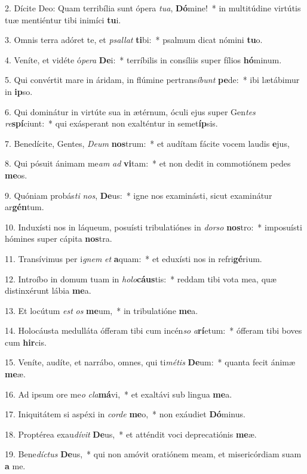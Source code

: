 2. Dícite Deo: Quam terribília sunt ópera \textit{tu}\textit{a}, \textbf{Dó}mine!~*  in multitúdine virtútis tuæ mentiéntur tibi inimíci \textbf{tu}i.\

3. Omnis terra adóret te, et \textit{psal}\textit{lat} \textbf{ti}bi:~*  psalmum dicat nómini \textbf{tu}o.\

4. Veníte, et vidéte ó\textit{pe}\textit{ra} \textbf{De}i:~*  terríbilis in consíliis super fílios \textbf{hó}minum.\

5. Qui convértit mare in áridam, in flúmine pertrans\textit{í}\textit{bunt} \textbf{pe}de:~*  ibi lætábimur in \textbf{ip}so.\

6. Qui dominátur in virtúte sua in ætérnum, óculi ejus super Gen\textit{tes} \textit{re}\textbf{spí}ciunt:~*  qui exásperant non exalténtur in semet\textbf{íp}sis.\

7. Benedícite, Gentes, \textit{De}\textit{um} \textbf{nos}trum:~*  et audítam fácite vocem laudis \textbf{e}jus,\

8. Qui pósuit ánimam me\textit{am} \textit{ad} \textbf{vi}tam:~*  et non dedit in commotiónem pedes \textbf{me}os.\

9. Quóniam probás\textit{ti} \textit{nos}, \textbf{De}us:~*  igne nos examinásti, sicut examinátur ar\textbf{gén}tum.\

10. Induxísti nos in láqueum, posuísti tribulatiónes in \textit{dor}\textit{so} \textbf{nos}tro:~*  imposuísti hómines super cápita \textbf{nos}tra.\

11. Transívimus per i\textit{gnem} \textit{et} \textbf{a}quam:~*  et eduxísti nos in refri\textbf{gé}rium.\

12. Introíbo in domum tuam in \textit{ho}\textit{lo}\textbf{cáus}tis:~*  reddam tibi vota mea, quæ distinxérunt lábia \textbf{me}a.\

13. Et locútum \textit{est} \textit{os} \textbf{me}um,~*  in tribulatióne \textbf{me}a.\

14. Holocáusta medulláta ófferam tibi cum incén\textit{so} \textit{a}\textbf{rí}etum:~*  ófferam tibi boves cum \textbf{hir}cis.\

15. Veníte, audíte, et narrábo, omnes, qui ti\textit{mé}\textit{tis} \textbf{De}um:~*  quanta fecit ánimæ \textbf{me}æ.\

16. Ad ipsum ore me\textit{o} \textit{cla}\textbf{má}vi,~*  et exaltávi sub lingua \textbf{me}a.\

17. Iniquitátem si aspéxi in \textit{cor}\textit{de} \textbf{me}o,~*  non exáudiet \textbf{Dó}minus.\

18. Proptérea exau\textit{dí}\textit{vit} \textbf{De}us,~*  et atténdit voci deprecatiónis \textbf{me}æ.\

19. Bene\textit{díc}\textit{tus} \textbf{De}us,~*  qui non amóvit oratiónem meam, et misericórdiam suam \textbf{a} me.\

